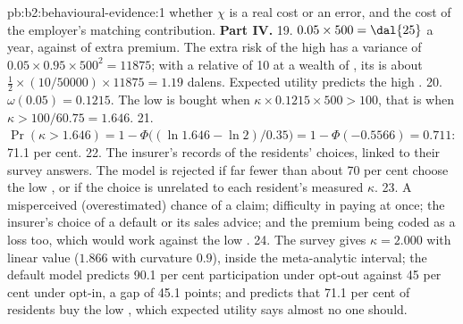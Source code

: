 \begin{solution}{pb:b2:behavioural-evidence:1}
whether $\chi$ is a real cost or an error, and the cost of the employer's matching contribution.
\textbf{Part IV.}
19. $0.05 \times 500 = \dal{25}$ a year, against  of extra premium. The extra risk of the high
 has a variance of $0.05 \times 0.95 \times 500^2 = 11875$; with a relative  of
10 at a wealth of , its  is about $\tfrac12 \times (10/50000) \times 11875 = 1.19$
dalens. Expected utility predicts the high .
20. $\omega(0.05) = 0.1215$. The low  is bought when $\kappa \times 0.1215 \times 500 > 100$,
that is when $\kappa > 100/60.75 = 1.646$.
21. $\Pr(\kappa > 1.646) = 1 - \Phi\bigl((\ln 1.646 - \ln 2)/0.35\bigr) = 1 - \Phi(-0.5566) = 0.711$:
71.1 per cent.
22. The insurer's records of the residents'  choices, linked to their survey answers. The model
is rejected if far fewer than about 70 per cent choose the low , or if the choice is unrelated
to each resident's measured $\kappa$.
23. A misperceived (overestimated) chance of a claim; difficulty in paying  at once; the
insurer's choice of a default  or its sales advice; and the premium being coded as a loss too,
which would work against the low .
24. The survey gives $\kappa = 2.000$ with linear value ($1.866$ with curvature $0.9$), inside the
meta-analytic interval; the default model predicts 90.1 per cent participation under opt-out against
45 per cent under opt-in, a gap of 45.1 points; and  predicts that 71.1 per cent of
residents buy the low , which expected utility says almost no one should.
\end{solution}
